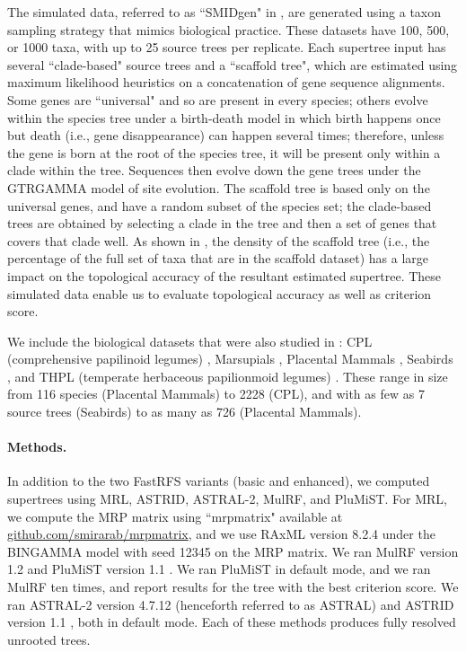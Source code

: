 The simulated data, referred to as ``SMIDgen" in \cite{smidgen},
are generated
using  a taxon sampling strategy that mimics biological practice. 
These datasets have
100, 500, or 1000 taxa, with up to 25 source trees per replicate. 
Each supertree input has several ``clade-based" source trees and a ``scaffold tree", 
which are estimated using maximum likelihood heuristics on a concatenation 
of gene sequence alignments. 
Some genes are ``universal" and so are present in every species; others
evolve within the species tree under a birth-death model in which birth happens once but death (i.e., gene disappearance) can happen several times; therefore, unless the gene is born at the root of the species tree, it will be present only within a clade within the tree. Sequences then evolve down the gene trees under the GTRGAMMA model of site evolution.
The scaffold tree is based only on the universal genes, and have a random
subset of the species set; the clade-based trees are obtained by
selecting a clade in the tree and then a set of genes that covers
that clade well.
As shown in \cite{smidgen}, the density of the scaffold tree (i.e., the percentage of the full set of taxa that are in the scaffold dataset) has a large impact on the topological accuracy of the resultant estimated supertree.
 These simulated data enable us to evaluate topological accuracy as well as criterion score.
 
We include the biological datasets that were  also studied in
\cite{smidgen}:
CPL (comprehensive papilinoid
legumes) \cite{cpl},
Marsupials \cite{marsupial},
Placental Mammals \cite{placental},
Seabirds \cite{kennedy2002seabird}, 
and THPL (temperate herbaceous papilionmoid legumes) \cite{THPL}.
These range 
in size from 116 species (Placental
Mammals) to 2228 (CPL), and with
as few as 7 source trees (Seabirds) to as many as 726 (Placental Mammals).


\paragraph{\bf Methods.  }
In addition to the two FastRFS variants (basic and enhanced),
we computed supertrees using MRL, ASTRID, ASTRAL-2, MulRF, and PluMiST.
For 
MRL, 
we compute 
the MRP matrix using ``mrpmatrix" available at
\url{github.com/smirarab/mrpmatrix}, and we
use
RAxML \cite{RAxML} version 8.2.4
under the BINGAMMA model  with seed 12345 on the MRP matrix.
We ran 
MulRF version 1.2 \cite{mulrf} and
PluMiST version 1.1 \cite{plumist}.
We ran PluMiST in default mode, and we ran
MulRF ten times, and report results for the 
tree with the best criterion score.
We ran
ASTRAL-2 version 4.7.12  \cite{ASTRAL2} (henceforth
referred to as ASTRAL)
and
ASTRID version 1.1 \cite{ASTRID}, both in default mode.
Each of these methods produces fully resolved
unrooted trees.  


